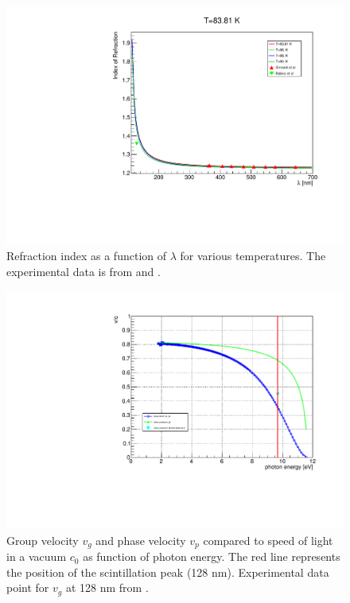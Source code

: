 \documentclass{article}
\begin{document}
\begin{figure}[ht]
\begin{center}
\includegraphics[width=35.5pc]{sellmeier.pdf}
\end{center}
\caption{\label{fig:sellmeier}Refraction index as a function of $\lambda$ for various temperatures. The experimental data is from \cite{ref:Sinnock} and \cite{ref:vg}.}
\end{figure}
\begin{figure}[ht]
\begin{center}
\includegraphics[width=35.5pc]{velocity.pdf}
\end{center}
\caption{\label{fig:vg}Group velocity $v_g$ and phase velocity $v_p$ compared to speed of light in a vacuum $c_{0}$ as function of photon energy. The red line represents the position of the scintillation peak (128 nm).
Experimental data point for $v_g$ at 128 nm from \cite{ref:vg}. }
\end{figure}
\end{document}
